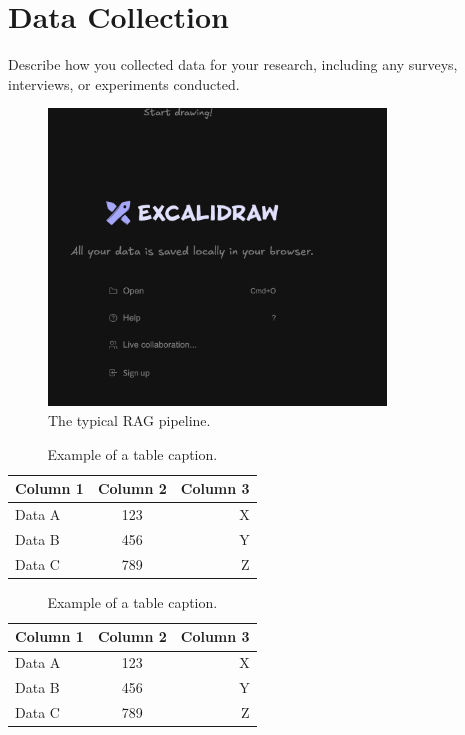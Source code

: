 \documentclass[12pt]{report}
\begin{document}
\section{Data Collection}
Describe how you collected data for your research, including any surveys, interviews, or experiments conducted.
\begin{figure}
    \centering
    \includegraphics[width=0.8\textwidth]{images/1/apa-ini.png}
    \caption{The typical RAG pipeline.}
    \label{fig:example2}
\end{figure}

\lipsum[1-2] %

\begin{table}[htbp]
  \centering
  \caption{Example of a table caption.}
  \label{tab:example1}
  \begin{tabular}{|l|c|r|}
    \hline
    Column 1 & Column 2 & Column 3 \\
    \hline
    Data A   & 123      & X \\
    Data B   & 456      & Y \\
    Data C   & 789      & Z \\
    \hline
  \end{tabular}
\end{table}

\begin{table}[htbp]
  \centering
  \caption{Example of a table caption.}
  \label{tab:example2}
  \begin{tabular}{lcr}
    \toprule
    Column 1 & Column 2 & Column 3 \\
    \midrule
    Data A   & 123      & X \\
    Data B   & 456      & Y \\
    Data C   & 789      & Z \\
    \bottomrule
  \end{tabular}
\end{table}
\end{document}

